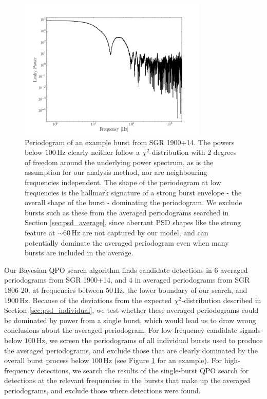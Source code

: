 \documentclass[numberedappendix]{emulateapj}
\newcommand{\hz}{\,\mathrm{Hz}}
\begin{document}
\begin{figure}[htbp]
\begin{center}
\includegraphics[width=9cm]{envelope_burst_ps.png}
\caption{Periodogram of an example burst from SGR 1900+14. The powers below $100 \hz$ clearly neither follow a $\chi^2$-distribution with $2$ degrees of freedom around the underlying power spectrum, as is the assumption for our analysis method, nor are neighbouring frequencies independent. The shape of the periodogram at low frequencies is the hallmark signature of a strong burst envelope - the overall shape of the burst - dominating the periodogram. We exclude bursts such as these from the averaged periodograms searched in Section \ref{sec:psd_average}, since aberrant PSD shapes like the strong feature at $\sim 60 \hz$ are not captured by our model, and can potentially dominate the averaged periodogram even when many bursts are included in the average.}
\label{fig:envelope_example}
\end{center}
\end{figure}


Our Bayesian QPO search algorithm finds candidate detections in $6$ averaged periodograms from SGR 1900+14, and $4$ in averaged periodograms from SGR 1806-20, at frequencies between $50 \hz$, the lower boundary of our search, and $1900 \hz$. Because of the deviations from the expected $\chi^2$-distribution described in Section \ref{sec:psd_individual}, we test whether these averaged periodograms could be dominated by power from a single burst, which would lead us to draw wrong conclusions about the averaged periodogram. For low-frequency candidate signals below $100 \hz$, we screen the periodograms of all individual bursts used to produce the averaged periodograms, and exclude those that are clearly dominated by the overall burst process below $100 \hz$ (see Figure \ref{fig:envelope_example} for an example). For high-frequency detections, we search the results of the single-burst QPO search for detections at the relevant frequencies in the bursts that make up the averaged periodograms, and exclude those where detections were found. 
\end{document}
